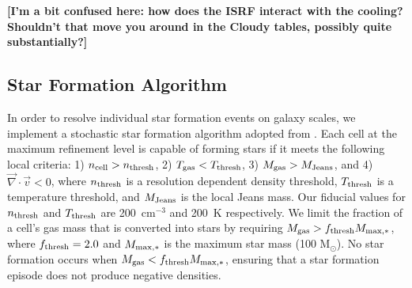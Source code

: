 \documentclass[twocolumn]{aastex61}
\begin{document}
   {\bf [I'm a bit confused here: how does the ISRF interact with the cooling?  Shouldn't that move you around in the Cloudy tables, possibly quite substantially?]}

\subsection{Star Formation Algorithm}
\label{sec:star formation}
In order to resolve individual star formation events on galaxy scales, we implement a stochastic star formation algorithm adopted from \citet{Goldbaum2015,Goldbaum2016}. Each cell at the maximum refinement level is capable of forming stars if it meets the following local criteria: 1) $n_{\rm cell} > n_{\rm thresh}$, 2) $T_{\rm gas} < T_{\rm thresh}$, 3) $M_{\rm gas} > M_{\rm Jeans}$, and 4) $\vec{\nabla} \cdot \vec{v} < 0$, where $n_{\rm thresh}$ is a resolution dependent density threshold, $T_{\rm thresh}$ is a temperature threshold, and $M_{\rm Jeans}$ is the local Jeans mass. Our fiducial values for $n_{\rm thresh}$ and $T_{\rm thresh}$ are 200~cm$^{-3}$ and 200~K respectively. We limit the fraction of a cell's gas mass that is converted into stars by requiring $M_{\rm gas} > f_{\rm thresh} M_{\rm max,*}$, where $f_{\rm thresh} = 2.0 $ and $M_{\rm max,*}$ is the maximum star mass (100 M$_{\odot}$). No star formation occurs when $M_{\rm gas} < f_{\rm thresh} M_{\rm max,*}$, ensuring that a star formation episode does not produce negative densities.
\end{document}
